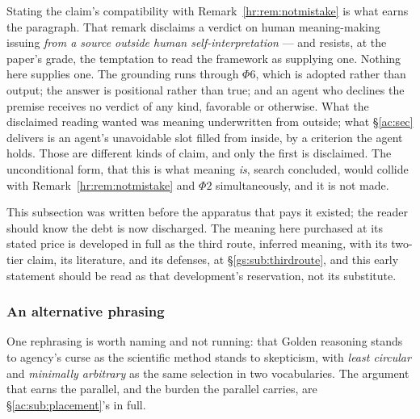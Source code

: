 \documentclass[11pt]{article}
\numberwithin{equation}{section}
\theoremstyle{plain}
\theoremstyle{definition}
\theoremstyle{remark}
\begin{document}
Stating the claim's compatibility with Remark~\ref{hr:rem:notmistake} is what earns the paragraph. That remark disclaims a verdict on human meaning-making issuing \emph{from a source outside human self-interpretation} --- and resists, at the paper's grade, the temptation to read the framework as supplying one. Nothing here supplies one. The grounding runs through $\Phi6$, which is adopted rather than output; the answer is positional rather than true; and an agent who declines the premise receives no verdict of any kind, favorable or otherwise. What the disclaimed reading wanted was meaning underwritten from outside; what \S\ref{ac:sec} delivers is an agent's unavoidable slot filled from inside, by a criterion the agent holds. Those are different kinds of claim, and only the first is disclaimed. The unconditional form, that this is what meaning \emph{is}, search concluded, would collide with Remark~\ref{hr:rem:notmistake} and $\Phi2$ simultaneously, and it is not made.

This subsection was written before the apparatus that pays it existed;
the reader should know the debt is now discharged. The meaning here
purchased at its stated price is developed in full as the third route, inferred meaning, with its two-tier claim, its literature, and its
defenses, at \S\ref{gs:sub:thirdroute}, and this early statement
should be read as that development's reservation, not its substitute.

\subsubsection{An alternative phrasing}\label{ac:ssub:phrasing}

One rephrasing is worth naming and not running: that Golden reasoning stands to agency's curse as the scientific method stands to skepticism, with \emph{least circular} and \emph{minimally arbitrary} as the same selection in two vocabularies. The argument that earns the parallel, and the burden the parallel carries, are \S\ref{ac:sub:placement}'s in full.
\end{document}

